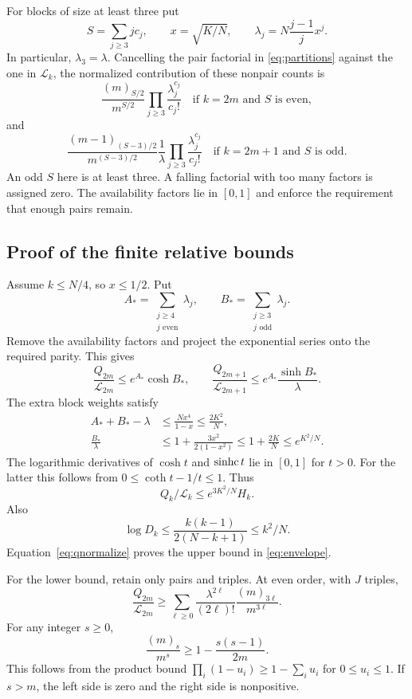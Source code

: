 For blocks of size at least three put
\[
S=\sum_{j\ge3}jc_j,\qquad x=\sqrt{K/N},\qquad
\lambda_j=N\frac{j-1}{j}x^j.
\]
In particular, $\lambda_3=\lambda$. Cancelling the pair factorial in \eqref{eq:partitions} against the one in $\mathcal L_k$, the normalized contribution of these nonpair counts is
\begin{equation}\label{eq:availabilityeven}
\frac{(m)_{S/2}}{m^{S/2}}
\prod_{j\ge3}\frac{\lambda_j^{c_j}}{c_j!}
\quad\text{if }k=2m\text{ and }S\text{ is even},
\end{equation}
and
\begin{equation}\label{eq:availabilityodd}
\frac{(m-1)_{(S-3)/2}}{m^{(S-3)/2}}
\frac1\lambda\prod_{j\ge3}\frac{\lambda_j^{c_j}}{c_j!}
\quad\text{if }k=2m+1\text{ and }S\text{ is odd}.
\end{equation}
An odd $S$ here is at least three. A falling factorial with too many factors is assigned zero. The availability factors lie in $[0,1]$ and enforce the requirement that enough pairs remain.

\subsection{Proof of the finite relative bounds}

Assume $k\le N/4$, so $x\le1/2$. Put
\[
A_* =\sum_{\substack{j\ge4\\j\text{ even}}}\lambda_j,
\qquad B_* =\sum_{\substack{j\ge3\\j\text{ odd}}}\lambda_j.
\]
Remove the availability factors and project the exponential series onto the required parity. This gives
\[
\frac{Q_{2m}}{\mathcal L_{2m}}\le e^{A_*}\cosh B_*,\qquad
\frac{Q_{2m+1}}{\mathcal L_{2m+1}}\le e^{A_*}\frac{\sinh B_*}{\lambda}.
\]
The extra block weights satisfy
\begin{align*}
A_*+B_*-\lambda&\le\frac{Nx^4}{1-x}\le\frac{2K^2}N,\\
\frac{B_*}{\lambda}&\le1+\frac{3x^2}{2(1-x^2)}
\le1+\frac{2K}N\le e^{K^2/N}.
\end{align*}
The logarithmic derivatives of $\cosh t$ and $\operatorname{sinhc} t$ lie in $[0,1]$ for $t>0$. For the latter this follows from $0\le\coth t-1/t\le1$. Thus
\[
Q_k/\mathcal L_k\le e^{3K^2/N}H_k.
\]
Also
\[
\log D_k\le\frac{k(k-1)}{2(N-k+1)}\le k^2/N.
\]
Equation~\eqref{eq:qnormalize} proves the upper bound in \eqref{eq:envelope}.

For the lower bound, retain only pairs and triples. At even order, with $J$ triples,
\[
\frac{Q_{2m}}{\mathcal L_{2m}}
\ge\sum_{\ell\ge0}\frac{\lambda^{2\ell}}{(2\ell)!}
\frac{(m)_{3\ell}}{m^{3\ell}}.
\]
For any integer $s\ge0$,
\[
\frac{(m)_s}{m^s}\ge1-\frac{s(s-1)}{2m}.
\]
This follows from the product bound $\prod_i(1-u_i)\ge1-\sum_i u_i$ for $0\le u_i\le1$. If $s>m$, the left side is zero and the right side is nonpositive.

